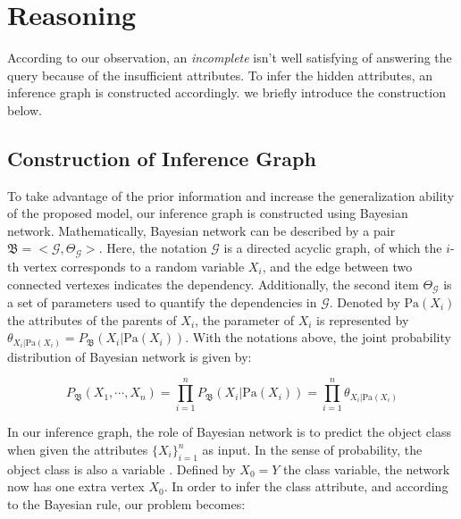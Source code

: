 \section{Reasoning}
\label{sec-reasoning}

According to our observation,  an {\em incomplete}  isn't well satisfying of answering the query because of the insufficient attributes.
To infer the hidden attributes, 
an inference graph is constructed accordingly.  
we briefly introduce the construction below. 

\subsection{Construction of Inference Graph}
To take advantage of the prior information and increase the generalization ability of the proposed model, our inference graph is constructed using Bayesian network.
Mathematically, Bayesian network \cite{friedman1997bayesian} can be described by a pair $\mathfrak{B}=<\mathcal{G},\varTheta_\mathcal{G}>$. 
Here, the notation $\mathcal{G}$ is a directed acyclic graph, of which the $i$-th vertex corresponds to a random variable $X_i$, and the edge between two connected vertexes indicates the dependency. 
Additionally, the second item $\varTheta_\mathcal{G}$ is a set of parameters used to quantify the dependencies in $\mathcal{G}$.
Denoted by $\text{Pa}(X_i)$ the attributes of the parents of $X_i$, 
the parameter of $X_i$ is represented by  $\theta_{X_i | \text{Pa}(X_i)} = P_\mathfrak{B}(X_i| \text{Pa}{(X_i)})$.
With the notations above, the joint probability distribution of Bayesian network is given by:

\begin{equation}\label{eq:BNOri}
P_\mathfrak{B}(X_1, \cdots, X_n) = 
\prod_{i=1}^{n} P_\mathfrak{B}(X_i| \text{Pa}{(X_i)})=
\prod_{i=1}^{n} \theta_{X_i | \text{Pa}(X_i)}
\end{equation}
\vspace{-1ex}

In our inference graph, the role of Bayesian network is to predict the object class when given the attributes $\{X_i\}_{i=1}^n$ as input. In the sense of probability, the object class is also a variable \cite{koller2009probabilistic}.
Defined by $X_0=Y$ the class variable, the network now has one extra vertex $X_0$.
In order to infer the class attribute, and according to the Bayesian rule, our problem becomes:

